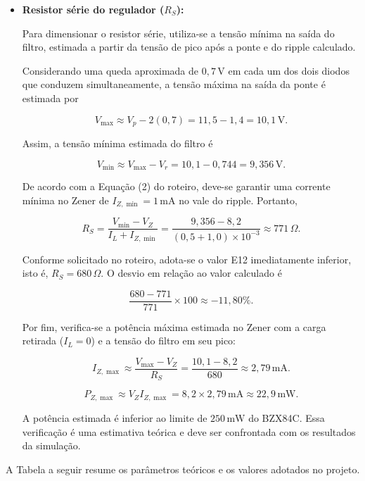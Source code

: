 \documentclass[11pt,a4paper]{article}
\begin{document}
\begin{itemize}
    \item \textbf{Resistor série do regulador ($R_S$):}

    Para dimensionar o resistor série, utiliza-se a tensão mínima
    na saída do filtro, estimada a partir da tensão de pico após
    a ponte e do ripple calculado.

    Considerando uma queda aproximada de $0{,}7\,\text{V}$ em cada
    um dos dois diodos que conduzem simultaneamente, a tensão máxima
    na saída da ponte é estimada por

    \[
        V_{\max}\approx V_p-2(0{,}7)
        =11{,}5-1{,}4
        =10{,}1\,\text{V}.
    \]

    Assim, a tensão mínima estimada do filtro é

    \[
        V_{\min}\approx V_{\max}-V_r
        =10{,}1-0{,}744
        =9{,}356\,\text{V}.
    \]

    De acordo com a Equação (2) do roteiro, deve-se garantir uma
    corrente mínima no Zener de $I_{Z,\min}=1\,\text{mA}$ no vale
    do ripple. Portanto,

    \[
        R_S=\frac{V_{\min}-V_Z}{I_L+I_{Z,\min}}
        =\frac{9{,}356-8{,}2}
        {(0{,}5+1{,}0)\times10^{-3}}
        \approx771\,\Omega.
    \]

    Conforme solicitado no roteiro, adota-se o valor E12
    imediatamente inferior, isto é, $R_S=680\,\Omega$. O desvio
    em relação ao valor calculado é

    \[
        \frac{680-771}{771}\times100
        \approx-11{,}80\%.
    \]

    Por fim, verifica-se a potência máxima estimada no Zener com
    a carga retirada ($I_L=0$) e a tensão do filtro em seu pico:

    \[
        I_{Z,\max}\approx\frac{V_{\max}-V_Z}{R_S}
        =\frac{10{,}1-8{,}2}{680}
        \approx2{,}79\,\text{mA}.
    \]

    \[
        P_{Z,\max}\approx V_Z I_{Z,\max}
        =8{,}2\times2{,}79\,\text{mA}
        \approx22{,}9\,\text{mW}.
    \]

    A potência estimada é inferior ao limite de $250\,\text{mW}$
    do BZX84C. Essa verificação é uma estimativa teórica e deve
    ser confrontada com os resultados da simulação.

\end{itemize}

A Tabela a seguir resume os parâmetros teóricos e os valores
adotados no projeto.
\end{document}
